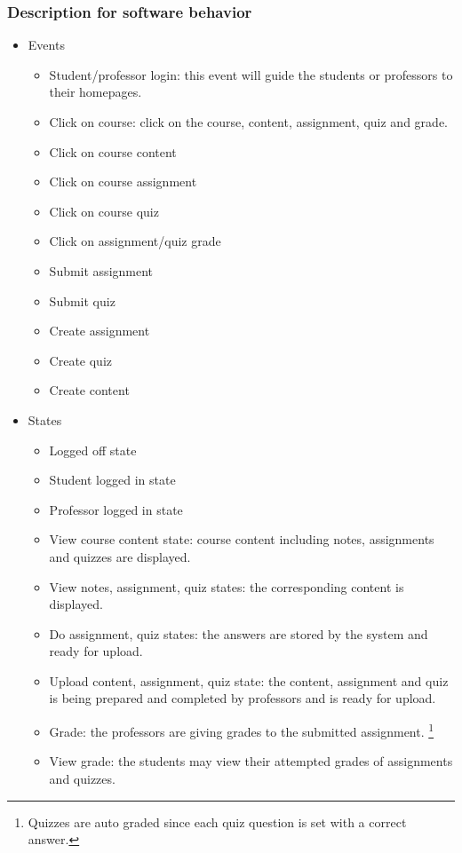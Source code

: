 \documentclass[paper=a4, fontsize=11pt]{scrartcl}
\numberwithin{equation}{section}		%
\numberwithin{figure}{section}			%
\numberwithin{table}{section}				%
\begin{document}
\subsubsection{Description for software behavior}

\begin{itemize}
	\item Events
	\begin{itemize}
		\item Student/professor login: this event will guide the students or professors to their homepages.
		\item Click on course: click on the course, content, assignment, quiz and grade.
		\item Click on course content
		\item Click on course assignment
		\item Click on course quiz
		\item Click on assignment/quiz grade
		\item Submit assignment
		\item Submit quiz
		\item Create assignment
		\item Create quiz
		\item Create content
	\end{itemize}
	\item States
	\begin{itemize}
		\item Logged off state
		\item Student logged in state
		\item Professor logged in state
		\item View course content state: course content including notes, assignments and quizzes are displayed.
		\item View notes, assignment, quiz states: the corresponding content is displayed.
		\item Do assignment, quiz states: the answers are stored by the system and ready for upload.
		\item Upload content, assignment, quiz state: the content, assignment and quiz is being prepared and completed by professors and is ready for upload.
		\item Grade: the professors are giving grades to the submitted assignment. \footnote{Quizzes are auto graded since each quiz question is set with a correct answer.}
		\item View grade: the students may view their attempted grades of assignments and quizzes.
	\end{itemize}
\end{itemize}
\end{document}
